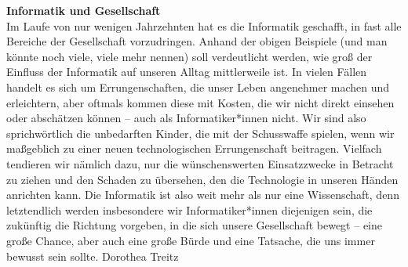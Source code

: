 {    \textbf{Informatik und Gesellschaft}\\
    Im Laufe von nur wenigen Jahrzehnten hat es die Informatik geschafft, in fast alle Bereiche der Gesellschaft vorzudringen. Anhand der obigen Beispiele (und man könnte noch viele, viele mehr nennen) soll verdeutlicht werden, wie groß der Einfluss der Informatik auf unseren Alltag mittlerweile ist. In vielen Fällen handelt es sich um Errungenschaften, die unser Leben angenehmer machen und erleichtern, aber oftmals kommen diese mit Kosten, die wir nicht direkt einsehen oder abschätzen können -- auch als Informatiker*innen nicht. Wir sind also sprichwörtlich die unbedarften Kinder, die mit der Schusswaffe spielen, wenn wir maßgeblich zu einer neuen technologischen Errungenschaft beitragen. Vielfach tendieren wir nämlich dazu, nur die wünschenswerten Einsatzzwecke in Betracht zu ziehen und den Schaden zu übersehen, den die Technologie in unseren Händen anrichten kann. Die Informatik ist also weit mehr als nur eine Wissenschaft, denn letztendlich werden insbesondere wir Informatiker*innen diejenigen sein, die zukünftig die Richtung vorgeben, in die sich unsere Gesellschaft bewegt -- eine große Chance, aber auch eine große Bürde und eine Tatsache, die uns immer bewusst sein sollte.}
{Dorothea Treitz}

\vspace{2mm}


\newpage
